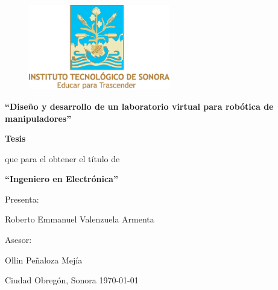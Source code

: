 \thispagestyle{empty}
\begin{figure}[!t]
\centering
\includegraphics[width=0.55\textwidth, height=0.25\textheight]{./figs/logoclr}
\end{figure}

\begin{center}

{\bf \LARGE ``Diseño y desarrollo de un laboratorio virtual para robótica de manipuladores''}

\vspace*{0.75cm}

{\bf \Large Tesis }

\vspace*{0.65cm}

{\Large que para el obtener el título de}

\vspace{0.65cm}

{\bf \Large ``Ingeniero en Electrónica''}

\vspace{0.75cm}

\begin{framed}

{\large Presenta:}

\vspace{0.3cm}

{\large Roberto Emmanuel Valenzuela Armenta}

\vspace{0.3cm}

{\large Asesor:}

\vspace{0.3cm}

{\large Ollin Peñaloza Mejía}

\end{framed}

\vfill

\begin{shaded*}
{\large {\color{white}Ciudad Obregón, Sonora \hfill \today}}
\end{shaded*}

\end{center}

\pagebreak